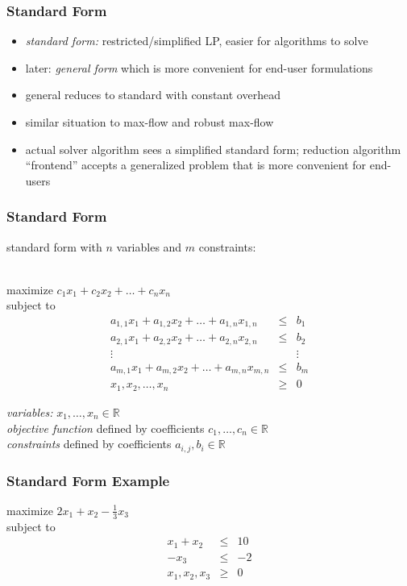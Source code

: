 \documentclass[10pt,aspectratio=169]{beamer}
\newcommand{\stanza}{ \\~\ }
\begin{document}
\begin{frame} \frametitle{Standard Form}
\begin{itemize}
  \item \emph{standard form:} restricted/simplified LP, easier for algorithms to solve
  \item later: \emph{general form} which is more convenient for end-user
    formulations
  \item general reduces to standard with constant overhead
  \item similar situation to max-flow and robust max-flow
  \item actual solver algorithm sees a simplified standard form; reduction
    algorithm ``frontend'' accepts a generalized problem that is more convenient
    for end-users
\end{itemize}
\end{frame}

\begin{frame} \frametitle{Standard Form}
standard form with $n$ variables and $m$ constraints:\stanza

maximize $c_1 x_1 + c_2 x_2 + \ldots + c_n x_n$ \\
subject to
\begin{eqnarray*}
a_{1,1} x_1 + a_{1,2} x_2 + \ldots + a_{1, n} x_{1, n} &\leq& b_1 \\
a_{2,1} x_1 + a_{2,2} x_2 + \ldots + a_{2, n} x_{2, n} &\leq& b_2 \\
\vdots & & \vdots \\
a_{m,1} x_1 + a_{m,2} x_2 + \ldots + a_{m, n} x_{m, n} &\leq& b_m \\
x_1, x_2, \ldots, x_n &\geq& 0
\end{eqnarray*}

\emph{variables:} $x_1, \ldots, x_n \in \mathbb{R}$ \\
\emph{objective function} defined by coefficients $c_1, \ldots, c_n \in \mathbb{R}$ \\
\emph{constraints} defined by coefficients $a_{i,j}, b_i \in \mathbb{R}$
\end{frame}

\begin{frame} \frametitle{Standard Form Example}
maximize $2 x_1 + x_2 - \frac{1}{3} x_3$ \\
subject to
\begin{eqnarray*}
x_1 + x_2 &\leq& 10 \\
-x_3 &\leq& -2 \\
x_1, x_2, x_3 &\geq& 0
\end{eqnarray*}
\end{frame}
\end{document}
